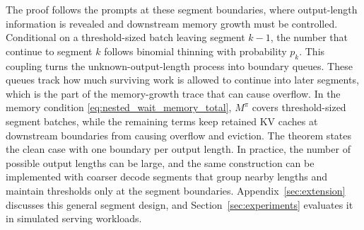 The proof follows the prompts at these segment boundaries, where output-length information is revealed and downstream memory growth must be controlled. Conditional on a threshold-sized batch leaving segment \(k-1\), the number that continue to segment \(k\) follows binomial thinning with probability \(p_k\). This coupling turns the unknown-output-length process into boundary queues. These queues track how much surviving work is allowed to continue into later segments, which is the part of the memory-growth trace that can cause overflow. In the memory condition \eqref{eq:nested_wait_memory_total}, \(M^\pi\) covers threshold-sized segment batches, while the remaining terms keep retained KV caches at downstream boundaries from causing overflow and eviction. The theorem states the clean case with one boundary per output length. In practice, the number of possible output lengths can be large, and the same construction can be implemented with coarser decode segments that group nearby lengths and maintain thresholds only at the segment boundaries. Appendix~\ref{sec:extension} discusses this general segment design, and Section~\ref{sec:experiments} evaluates it in simulated serving workloads.
